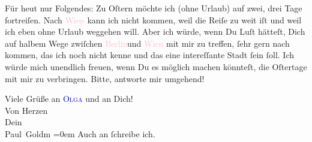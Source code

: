 \pstart
           Für heut nur Folgendes: Zu Oſtern möchte ich (ohne
               Urlaub) auf zwei, drei Tage fortreiſen. Nach \textcolor{pink}{Wien}{}\ledrightnote{\textcolor{pink}{Wien}}
               kann ich nicht kommen, weil die Reiſe zu weit iſt und weil ich eben ohne Urlaub
               weggehen will. Aber ich würde, wenn Du Luſt hätteſt, Dich auf halbem Wege zwiſchen
                  \textcolor{pink}{Berlin}{}\ledrightnote{\textcolor{pink}{Berlin}}{ }{\pb}und \textcolor{pink}{Wien}{}\ledrightnote{\textcolor{pink}{Wien}} mit mir
               zu treffen, ſehr gern nach \label{K_L03200-1v}\label{K_L03200-1h}
               kommen, das ich noch nicht kenne und das eine intereſſante Stadt ſein ſoll. Ich würde
               mich unendlich freuen, wenn Du es möglich machen könnteſt, die Oſtertage mit mir zu
               verbringen. Bitte, antworte mir umgehend!\pend
           
\pstart
           Viele Grüße an \textsc{\textcolor{blue}{Olga}{}\ledrightnote{\textcolor{blue}{Olga Schnitzler}}} und an Dich! {\\[\baselineskip]}Von Herzen {\\[\baselineskip]}Dein {\\[\baselineskip]}\spacefill\mbox{Paul Goldm}\pend
           \leftskip=0em{}
\pstart
           \noindent{}Auch an \label{K_L03200-2v}\label{K_L03200-2h} ſchreibe ich.\pend
           \endnumbering{}
\begin{anhang}
\end{anhang}
      